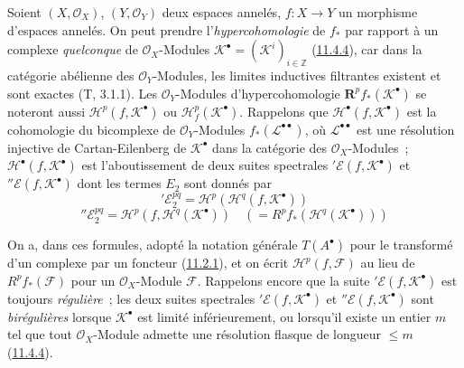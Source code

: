 \begin{env}[12.4.1]
\label{0.12.4.1-fr}
Soient $(X,\mathcal O_X)$, $(Y,\mathcal O_Y)$ deux espaces annelés,
$f:X\to Y$ un morphisme d'espaces annelés. On peut prendre
l'\emph{hypercohomologie} de $f_*$ par rapport à un complexe \emph{quelconque} de
$\mathcal O_X$-Modules
$\mathcal K^\bullet=(\mathcal K^i)_{i\in\mathbb Z}$
(\hyperref[0.11.4.4-fr]{11.4.4}), car dans la catégorie abélienne des
$\mathcal O_Y$-Modules, les limites inductives filtrantes existent et sont
exactes (T, 3.1.1). Les $\mathcal O_Y$-Modules d'hypercohomologie
$\mathbf{R}^p f_*(\mathcal K^\bullet)$ se noteront aussi
$\mathscr H^p(f,\mathcal K^\bullet)$ ou
$\mathscr H_f^p(\mathcal K^\bullet)$. Rappelons que
$\mathscr H^\bullet(f,\mathcal K^\bullet)$ est la cohomologie du bicomplexe
de $\mathcal O_Y$-Modules $f_*(\mathcal L^{\bullet\bullet})$, où
$\mathcal L^{\bullet\bullet}$ est une résolution injective de
Cartan-Eilenberg de $\mathcal K^\bullet$ dans la catégorie des
$\mathcal O_X$-Modules~; $\mathscr H^\bullet(f,\mathcal K^\bullet)$ est
l'aboutissement de deux suites spectrales
${}'\mathcal E(f,\mathcal K^\bullet)$ et ${}''\mathcal E(f,\mathcal K^\bullet)$ dont les
termes $E_2$ sont donnés par
\begin{equation}
\label{0.12.4.1.1-fr}
\tag{12.4.1.1}
{}'\mathcal E_2^{pq}=\mathcal H^p(\mathcal H^q(f,\mathcal K^\bullet))
\end{equation}
\begin{equation}
\label{0.12.4.1.2-fr}
\tag{12.4.1.2}
{}''\mathcal E_2^{pq}=\mathcal H^p(f,\mathcal H^q(\mathcal K^\bullet))
\quad(=R^p f_*(\mathcal H^q(\mathcal K^\bullet)))
\end{equation}

On a, dans ces formules, adopté la notation générale $T(A^\bullet)$ pour
le transformé d'un complexe par un foncteur
(\hyperref[0.11.2.1-fr]{11.2.1}), et on écrit
$\mathcal H^p(f,\mathcal F)$ au lieu de $R^p f_*(\mathcal F)$ pour un
$\mathcal O_X$-Module $\mathcal F$. Rappelons encore que la suite
${}'\mathcal E(f,\mathcal K^\bullet)$ est toujours \emph{régulière}~; les deux
suites spectrales ${}'\mathcal E(f,\mathcal K^\bullet)$ et
${}''\mathcal E(f,\mathcal K^\bullet)$ sont \emph{birégulières} lorsque
$\mathcal K^\bullet$ est limité inférieurement,
ou lorsqu'il existe un entier $m$ tel que tout $\mathcal O_X$-Module
admette une résolution flasque de longueur $\leq m$
(\hyperref[0.11.4.4-fr]{11.4.4}).
\end{env}


